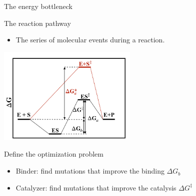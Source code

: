 \documentclass[presentation,smaller]{beamer}
\begin{document}
\begin{frame}[label={sec:org25e060b}]{The energy bottleneck}
\begin{block}{The reaction pathway}
\begin{itemize}
\item The series of molecular events during a reaction.
\end{itemize}

\begin{center}
\includegraphics[width=0.5\textwidth]{./img/reaction_pathway.png}
\end{center}
\end{block}

\begin{block}{Define the optimization problem}
\begin{itemize}
\item Binder: find mutations that improve the binding \(\Delta G_{b}\)
\item Catalyzer: find mutations that improve the catalysis \(\Delta G^{\ddagger}\)
\end{itemize}
\end{block}
\end{frame}
\end{document}
